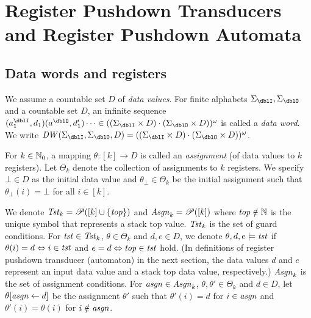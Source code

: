 \section{Register Pushdown Transducers and Register Pushdown Automata}
\subsection{Data words and registers}
We assume a countable set $D$ of \emph{data values}.
For finite alphabets $\Sigma_\dblI,\Sigma_\dblO$ and a countable set $D$,
an infinite sequence $(a^\dblI_1,d_1)(a^\dblO,d'_1)\cdots \in ((\Sigma_\dblI\times D)\cdot(\Sigma_\dblO\times D))^\omega$ is called a \emph{data word}.
We write $\DW(\Sigma_\dblI,\Sigma_\dblO,D)=((\Sigma_\dblI\times D)\cdot(\Sigma_\dblO\times D))^\omega$.

For $k\in\mathbb{N}_0$, a mapping $\theta: [k] \to D$ is called an \emph{assignment}
(of data values to $k$ registers).
Let $\Theta_k$ denote the collection of assignments to $k$ registers.
We specify $\bot\in D$ as the initial data value and
$\theta_\bot\in\Theta_k$ be the initial assignment such that
$\theta_\bot(i)=\bot$ for all $i\in[k]$.

We denote $\mathit{Tst}_k = \mathscr{P}([k]\cup\{\mathit{top}\})$ and $\mathit{Asgn}_k = \mathscr{P}([k])$
where $\mathit{top}\notin\mathbb{N}$ is the unique symbol that represents a stack top value.
$\mathit{Tst}_k$ is the set of guard conditions.
For $\mathit{tst}\in\mathit{Tst}_k$, $\theta\in\Theta_k$ and $d,e\in D$,
we denote $\theta,d,e\models\mathit{tst}$ if $\theta(i) = d \Leftrightarrow i\in\mathit{tst}$
and $e = d \Leftrightarrow \mathit{top}\in\mathit{tst}$ hold.
(In definitions of register pushdown transducer (automaton) in the next section,
the data values $d$ and $e$ represent an input data value and a stack top data value, respectively.)
$\mathit{Asgn}_k$ is the set of assignment conditions.
For $\mathit{asgn}\in\mathit{Asgn}_k$, $\theta,\theta'\in\Theta_k$ and $d\in D$,
let $\theta[\mathit{asgn}\leftarrow d]$ be the assignment
$\theta'$ such that $\theta'(i) = d$ for $i\in\mathit{asgn}$ and $\theta'(i)=\theta(i)$ for $i\notin\mathit{asgn}$.

